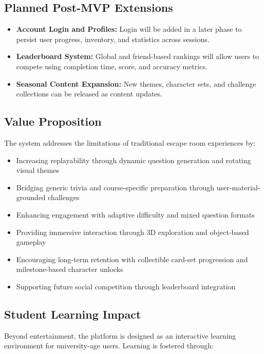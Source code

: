 \documentclass[12pt]{article}
\begin{document}
\subsection{Planned Post-MVP Extensions}

\begin{itemize}
    \item \textbf{Account Login and Profiles:} Login will be added in a later phase to persist user progress, inventory, and statistics across sessions.
    \item \textbf{Leaderboard System:} Global and friend-based rankings will allow users to compete using completion time, score, and accuracy metrics.
    \item \textbf{Seasonal Content Expansion:} New themes, character sets, and challenge collections can be released as content updates.
\end{itemize}

\subsection{Value Proposition}

The system addresses the limitations of traditional escape room experiences by:

\begin{itemize}
    \item Increasing replayability through dynamic question generation and rotating visual themes
    \item Bridging generic trivia and course-specific preparation through user-material-grounded challenges
    \item Enhancing engagement with adaptive difficulty and mixed question formats
    \item Providing immersive interaction through 3D exploration and object-based gameplay
    \item Encouraging long-term retention with collectible card-set progression and milestone-based character unlocks
    \item Supporting future social competition through leaderboard integration
\end{itemize}

\subsection{Student Learning Impact}

Beyond entertainment, the platform is designed as an interactive learning environment for university-age users. Learning is fostered through:
\end{document}
